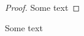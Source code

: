 \documentclass{beamer}
\begin{document}
\begin{frame}
\begin{proof}
    Some text
\end{proof}
\begin{theorem}
    Some text
\end{theorem}
\end{frame}
\end{document}
